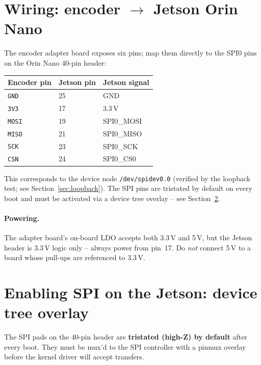 \documentclass[11pt,a4paper]{article}
\begin{document}
\section{Wiring: encoder $\to$ Jetson Orin Nano}
The encoder adapter board exposes six pins; map them directly to the
SPI0 pins on the Orin Nano 40-pin header:

\begin{center}\small
\begin{tabular}{lll}
\toprule
Encoder pin & Jetson pin & Jetson signal\\
\midrule
\texttt{GND}  & 25 & GND\\
\texttt{3V3}  & 17 & 3.3\,V\\
\texttt{MOSI} & 19 & SPI0\_MOSI\\
\texttt{MISO} & 21 & SPI0\_MISO\\
\texttt{SCK}  & 23 & SPI0\_SCK\\
\texttt{CSN}  & 24 & SPI0\_CS0\\
\bottomrule
\end{tabular}
\end{center}

\noindent This corresponds to the device node \texttt{/dev/spidev0.0}
(verified by the loopback test; see Section~\ref{sec:loopback}).
The SPI pins are tristated by default on every boot and must be
activated via a device tree overlay -- see Section~\ref{sec:overlay}.

\paragraph{Powering.} The adapter board's on-board LDO accepts both
3.3\,V and 5\,V, but the Jetson header is 3.3\,V logic only -- always
power from pin~17.  Do \emph{not} connect 5\,V to a board whose pull-ups
are referenced to 3.3\,V.

\section{Enabling SPI on the Jetson: device tree overlay}
\label{sec:overlay}
The SPI pads on the 40-pin header are \textbf{tristated (high-Z) by
default} after every boot.  They must be mux'd to the SPI controller
with a pinmux overlay before the kernel driver will accept transfers.
\end{document}
